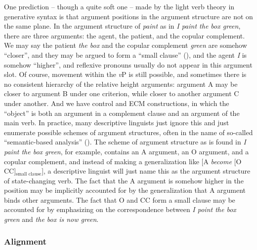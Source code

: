 \documentclass[UTF8, a4paper, oneside, scheme=plain]{ctexart}
\newcommand*{\term}[1]{\emph{#1}}
\newcommand*{\corpus}[1]{\emph{#1}}
\newcommand*{\vP}{\textit{v}P}
\begin{document}
One prediction -- though a quite soft one -- made by the light verb theory in generative syntax 
is that argument positions in the argument structure are not on the same plane.
In the argument structure of \corpus{paint} as in \corpus{I paint the box green},
there are three arguments:
the agent, the patient, and the copular complement.
We may say the patient \corpus{the box} and the copular complement \corpus{green} 
are somehow ``closer'',
and they may be argued to form a ``small clause'' (),
and the agent \corpus{I} is somehow ``higher'',
and reflexive pronouns usually do not appear in this argument slot.
Of course, movement within the \vP{} is still possible,
and sometimes there is no consistent hierarchy of the relative height arguments:
argument A may be closer to argument B under one criterion,
while closer to another argument C under another.
And we have control and ECM constructions,
in which the ``object'' is both an argument in a complement clause and 
an argument of the main verb.
In practice, many descriptive linguists just ignore this 
and just enumerate possible schemes of argument structures,
often in the name of so-called ``semantic-based analysis'' ().
The scheme of argument structure as is found in \corpus{I paint the box green}, for example,
contains an A argument, an O argument, and a copular complement,
and instead of making a generalization like [A \term{become} [O CC]$_{\text{small clause}}$],
a descriptive linguist will just name this as 
the argument structure of state-changing verb. %
The fact that the A argument is somehow higher in the position may be implicitly accounted for 
by the generalization that A argument binds other arguments.
The fact that O and CC form a small clause may be accounted for 
by emphasizing on the correspondence between 
\corpus{I point the box green} and \corpus{the box is now green}. 

\subsubsection{Alignment}
\end{document}
